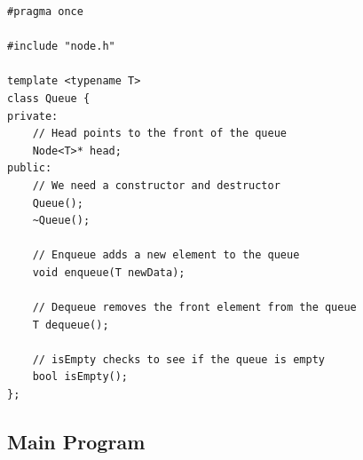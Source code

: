 \documentclass[letterpaper, 10pt,DIV=13]{scrartcl}
\numberwithin{equation}{section} %
\numberwithin{figure}{section} %
\numberwithin{table}{section} %
\begin{document}
\begin{lstlisting}[frame=single, ]  
#pragma once

#include "node.h"

template <typename T>
class Queue {
private:
    // Head points to the front of the queue
    Node<T>* head;
public:
    // We need a constructor and destructor
    Queue();
    ~Queue();

    // Enqueue adds a new element to the queue
    void enqueue(T newData);

    // Dequeue removes the front element from the queue
    T dequeue();

    // isEmpty checks to see if the queue is empty
    bool isEmpty();
};
\end{lstlisting}

\subsection{Main Program}\label{mainProgramListing}
\end{document}

